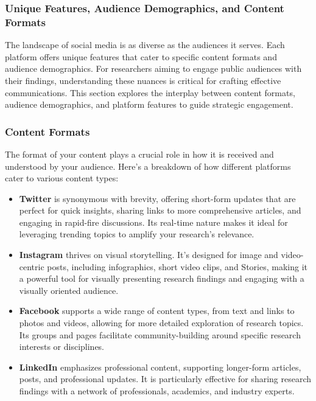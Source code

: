 \documentclass[
]{book}
\providecommand{\tightlist}{%
  \setlength{\itemsep}{0pt}\setlength{\parskip}{0pt}}
\begin{document}
\hypertarget{unique-features-audience-demographics-and-content-formats}{%
\subsubsection*{Unique Features, Audience Demographics, and Content Formats}\label{unique-features-audience-demographics-and-content-formats}}

The landscape of social media is as diverse as the audiences it serves. Each platform offers unique features that cater to specific content formats and audience demographics. For researchers aiming to engage public audiences with their findings, understanding these nuances is critical for crafting effective communications. This section explores the interplay between content formats, audience demographics, and platform features to guide strategic engagement.

\hypertarget{content-formats}{%
\subsubsection*{Content Formats}\label{content-formats}}

The format of your content plays a crucial role in how it is received and understood by your audience. Here's a breakdown of how different platforms cater to various content types:

\begin{itemize}
\tightlist
\item
  \textbf{Twitter} is synonymous with brevity, offering short-form updates that are perfect for quick insights, sharing links to more comprehensive articles, and engaging in rapid-fire discussions. Its real-time nature makes it ideal for leveraging trending topics to amplify your research's relevance.
\item
  \textbf{Instagram} thrives on visual storytelling. It's designed for image and video-centric posts, including infographics, short video clips, and Stories, making it a powerful tool for visually presenting research findings and engaging with a visually oriented audience.
\item
  \textbf{Facebook} supports a wide range of content types, from text and links to photos and videos, allowing for more detailed exploration of research topics. Its groups and pages facilitate community-building around specific research interests or disciplines.
\item
  \textbf{LinkedIn} emphasizes professional content, supporting longer-form articles, posts, and professional updates. It is particularly effective for sharing research findings with a network of professionals, academics, and industry experts.
\end{itemize}
\end{document}
